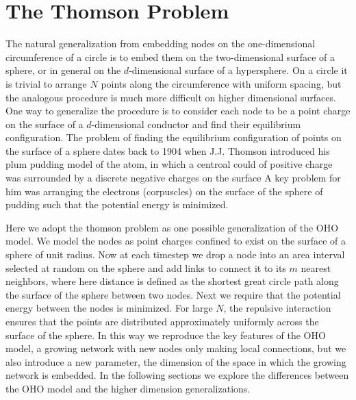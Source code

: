\documentclass[aps,pre,reprint,superscriptaddress,amsmath,amssymb]{revtex4-1}
\begin{document}
\section{The Thomson Problem}
The natural generalization from embedding nodes on the one-dimensional circumference of a circle is to embed them on the two-dimensional surface of a sphere, or in general on the $d$-dimensional surface of a hypersphere.
On a circle it is trivial to arrange $N$ points along the circumference with uniform spacing, but the analogous procedure is much more difficult on higher dimensional surfaces.
One way to generalize the procedure is to consider each node to be a point charge on the surface of a $d$-dimensional conductor and find their equilibrium configuration. 
The problem of finding the equilibrium configuration of points on the surface of a sphere dates back to 1904 when J.J. Thomson introduced his plum pudding model of the atom, in which a centroal could of positive charge was surrounded by a discrete negative charges on the surface \cite{thomson1904}
A key problem for him was arranging the electrons (corpuscles) on the surface of the sphere of pudding such that the potential energy is minimized.

Here we adopt the thomson problem as one possible generalization of the OHO model.
We model the nodes as point charges confined to exist on the surface of a sphere of unit radius.
Now at each timestep we drop a node into an area interval selected at random on the sphere and add links to connect it to its $m$ nearest neighbors, where here distance is defined as the shortest great circle path along the surface of the sphere between two nodes.
Next we require that the potential energy between the nodes is minimized.
For large $N$, the repulsive interaction ensures that the points are distributed approximately uniformly across the surface of the sphere.
In this way we reproduce the key features of the OHO model, a growing network with new nodes only making local connections, but we also introduce a new parameter, the dimension of the space in which the growing network is embedded.
In the following sections we explore the differences between the OHO model and the higher dimension generalizations.

\end{document}
